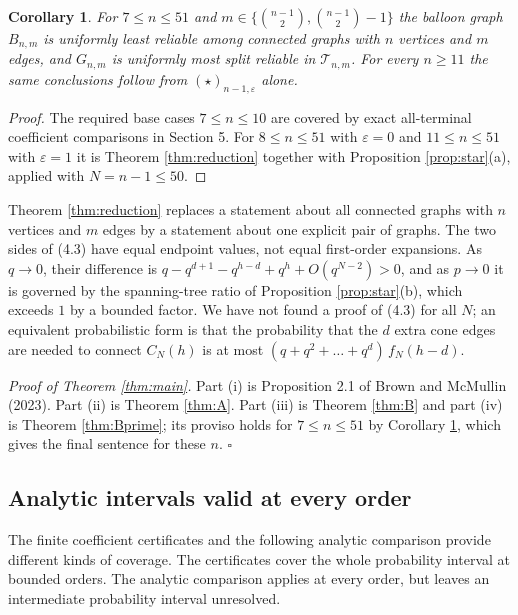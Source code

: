 \documentclass[
  11pt,
]{article}
\newtheorem{corollary}[theorem]{Corollary}
\theoremstyle{definition}
\theoremstyle{remark}
\begin{document}
\begin{corollary}\label{cor:n41}
For $7\le n\le 51$ and $m\in\{\binom{n-1}2,\binom{n-1}2-1\}$ the balloon graph $B_{n,m}$ is uniformly least reliable among connected graphs with $n$ vertices and $m$ edges, and $G_{n,m}$ is uniformly most split reliable in $\mathcal T_{n,m}$. For every $n\ge 11$ the same conclusions follow from $(\star)_{n-1,\varepsilon}$ alone.
\end{corollary}

\begin{proof}
The required base cases $7\le n\le10$ are covered by exact all-terminal coefficient comparisons in Section 5. For $8\le n\le51$ with $\varepsilon=0$ and $11\le n\le51$ with $\varepsilon=1$ it is Theorem \ref{thm:reduction} together with Proposition \ref{prop:star}(a), applied with $N=n-1\le50$.
\end{proof}

Theorem \ref{thm:reduction} replaces a statement about all connected
graphs with \(n\) vertices and \(m\) edges by a statement about one
explicit pair of graphs. The two sides of (4.3) have equal endpoint
values, not equal first-order expansions. As \(q\to0\), their difference
is \(q-q^{d+1}-q^{h-d}+q^h+O(q^{N-2})>0\), and as \(p\to0\) it is
governed by the spanning-tree ratio of Proposition \ref{prop:star}(b),
which exceeds \(1\) by a bounded factor. We have not found a proof of
(4.3) for all \(N\); an equivalent probabilistic form is that the
probability that the \(d\) extra cone edges are needed to connect
\(C_N(h)\) is at most \((q+q^2+\dots+q^d)\,f_N(h-d)\).

\emph{Proof of Theorem \ref{thm:main}.} Part (i) is Proposition 2.1 of
Brown and McMullin (2023). Part (ii) is Theorem \ref{thm:A}. Part (iii)
is Theorem \ref{thm:B} and part (iv) is Theorem \ref{thm:Bprime}; its
proviso holds for \(7\le n\le 51\) by Corollary \ref{cor:n41}, which
gives the final sentence for these \(n\). \(\square\)

\subsection{Analytic intervals valid at every
order}\label{analytic-intervals-valid-at-every-order}

The finite coefficient certificates and the following analytic
comparison provide different kinds of coverage. The certificates cover
the whole probability interval at bounded orders. The analytic
comparison applies at every order, but leaves an intermediate
probability interval unresolved.
\end{document}
